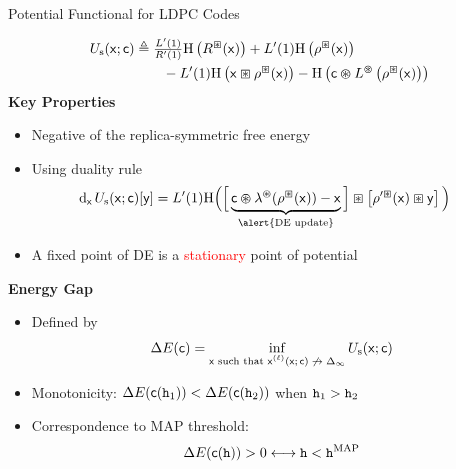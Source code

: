 \documentclass{beamer}
\newlength{\twocolwid}
\begin{document}
\begin{columns}[t]
  \begin{column}{\twocolwid}
    \vspace{2cm}
    \begin{block}{Potential Functional for LDPC Codes}
      \vspace{0.75cm}
      \setlength\tikzheight{14.5cm}
      \setlength\tikzwidth{19cm} 
      
      \begin{align*}
        U_\mathrm{s}(\mathsf{x}; \mathsf{c}) &\triangleq  \tfrac{L'(1)}{R'(1)} \mathrm{H} \left( R^{\boxast}(\mathsf{x}) \right) + L'(1) \mathrm{H} \left(  \rho^{\boxast}(\mathsf{x})  \right) \\
        & \qquad - L'(1) \mathrm{H} \left( \mathsf{x} \boxast \rho^{\boxast}(\mathsf{x}) \right) - \mathrm{H} \left(  \mathsf{c} \varoast L^{\varoast} \left( \rho^{\boxast}(\mathsf{x}) \right)  \right) 
      \end{align*}
      \vspace{1cm}
      \textcolor{jblue}{\bf Key Properties}
      \begin{itemize}
      \item Negative of the replica-symmetric free energy
      \item\vspace{0.75cm} Using duality rule
        \vspace{0.75cm}
        \begin{align*}
          \deri{\msx} \pots( \msx ; \msc ) [\msy] &= L'(1) \mathrm{H} \Big{(} \Big{[} \underbrace{\msc \vnop \lambda^{\vnop}(\rho^{\cnop}(\msx)) - \msx}_{\alert{\text{DE update}}} \Big{]} \cnop \left[ \rho'^{\cnop}(\msx) \cnop \msy \right] \Big{)}
        \end{align*}
      \item\vspace{0.75cm} A fixed point of DE is a \textcolor{red}{stationary} point of potential

      \end{itemize}
      \vspace{1cm}
      \textcolor{jblue}{\bf Energy Gap}
      \begin{itemize}
      \item\vspace{0.75cm} Defined by
        \begin{align*}
          \Delta E(\mathsf{c}) = \inf_{\text{$\mathsf{x}$ such that $\mathsf{x}^{(\ell)}(\mathsf{x} ; \mathsf{c}) \not \to \Delta_\infty$}} U_\mathrm{s}(\mathsf{x} ; \mathsf{c})
        \end{align*}
      \item\vspace{0.75cm} Monotonicity: $\Delta E(\mathsf{c}(\texttt{h}_1)) < \Delta E(\mathsf{c}(\texttt{h}_2)) $ when $\texttt{h}_1 > \texttt{h}_2$
      \item\vspace{0.75cm} Correspondence to MAP threshold:
        \begin{align*}
          \Delta E(\mathsf{c}(\texttt{h})) > 0  \longleftrightarrow  \texttt{h} < \texttt{h}^{\mathrm{MAP}}
        \end{align*}
      \end{itemize}
    \end{block}


\end{column}
\end{columns}
\end{document}
